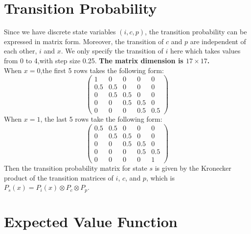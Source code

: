 \documentclass[12pt]{article}[margin=1in]
\begin{document}
\section{Transition Probability}
Since we have discrete state variables $(i,c,p)$, the transition probability
can be expressed in matrix form. Moreover, the transition of $c$ and $p$ are
independent of each other, $i$ and $x$. We only specify the transition of $i$
here which takes values from 0 to 4,with step size 0.25. \textbf{The matrix dimension is $17 \times 17$.} \\ When $x = 0$,the first 5 rows takes the following form:
\begin{equation}\label{eq:trans0}
    \begin{pmatrix}
        1   & 0   & 0   & 0   & 0   \\
        0.5 & 0.5 & 0   & 0   & 0   \\
        0   & 0.5 & 0.5 & 0   & 0   \\
        0   & 0   & 0.5 & 0.5 & 0   \\
        0   & 0   & 0   & 0.5 & 0.5
    \end{pmatrix}
\end{equation}
When $x = 1$, the last 5 rows take the following form:
\begin{equation}\label{eq:trans1}
    \begin{pmatrix}
        0.5 & 0.5 & 0   & 0   & 0   \\
        0   & 0.5 & 0.5 & 0   & 0   \\
        0   & 0   & 0.5 & 0.5 & 0   \\
        0   & 0   & 0   & 0.5 & 0.5 \\
        0   & 0   & 0   & 0   & 1
    \end{pmatrix}
\end{equation}
Then the transition probability matrix for state $s$ is given by the Kronecker product of the transition matrices of $i$, $c$, and $p$, which is $P_s(x) = P_i(x) \otimes P_c \otimes P_p$.
\section{Expected Value Function}
\end{document}
